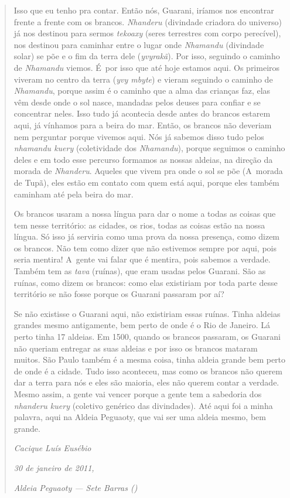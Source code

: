 \begin{quote}
\noindent
Isso que eu tenho pra contar. Então nós, Guarani, iríamos nos encontrar
frente a frente com os brancos. \emph{Nhanderu} (divindade criadora do
universo) já nos destinou para sermos \emph{tekoaxy} (seres terrestres com
corpo perecível), nos destinou para caminhar entre o lugar onde
\emph{Nhamandu} (divindade solar) se põe e o fim da terra dele
(\emph{yvyrakã}). Por isso, seguindo o caminho de \emph{Nhamandu} viemos. É~por isso
que até hoje estamos aqui. Os primeiros viveram no centro da terra (\emph{yvy
mbyte}) e vieram seguindo o caminho de \emph{Nhamandu}, porque assim é o caminho
que a alma das crianças faz, elas vêm desde onde o sol nasce, mandadas
pelos deuses para confiar e se concentrar neles. Isso tudo já acontecia
desde antes do brancos estarem aqui, já vínhamos para a beira do mar.
Então, os brancos não deveriam nem perguntar porque vivemos aqui. Nós
já sabemos disso tudo pelos \emph{nhamandu kuery} (coletividade dos \emph{Nhamandu}),
porque seguimos o caminho deles e em todo esse percurso formamos as
nossas aldeias, na direção da morada de \emph{Nhanderu}. Aqueles que vivem pra
onde o sol se põe (A~morada de Tupã), eles estão em contato com
quem está aqui, porque eles também caminham até pela beira do mar. 

\noindent
Os brancos usaram a nossa língua para dar o nome a todas as coisas que
tem nesse território: as cidades, os rios, todas as coisas estão na
nossa língua. Só isso já serviria como uma prova da nossa presença,
como dizem os brancos. Não tem como dizer que não estivemos sempre por
aqui, pois seria mentira! A~gente vai falar que é mentira, pois sabemos a
verdade. Também tem as \emph{tava} (ruínas), que eram usadas pelos Guarani.
São as ruínas, como dizem os brancos: como elas existiriam por toda
parte desse território se não fosse porque os Guarani passaram por aí? 

\noindent
Se não existisse o Guarani aqui, não existiriam essas ruínas. Tinha
aldeias grandes mesmo antigamente, bem perto de onde é o Rio de
Janeiro. Lá perto tinha 17 aldeias. Em 1500, quando os brancos
passaram, os Guarani não queriam entregar as suas aldeias e por isso os
brancos mataram muitos. São Paulo também é a mesma coisa, tinha aldeia
grande bem perto de onde é a cidade. Tudo isso aconteceu, mas como os
brancos não querem dar a terra para nós e eles são maioria, eles não
querem contar a verdade. Mesmo assim, a gente vai vencer porque a gente
tem a sabedoria dos \emph{nhanderu kuery} (coletivo genérico das divindades).
Até aqui foi a minha palavra, aqui na Aldeia Peguaoty, que vai ser uma
aldeia mesmo, bem grande.
\medskip
\begin{flushright}
\emph{Cacique Luís Eusébio}

\emph{30 de janeiro de 2011,}

\emph{Aldeia Peguaoty --- Sete Barras ()}

\end{flushright}
\end{quote}

